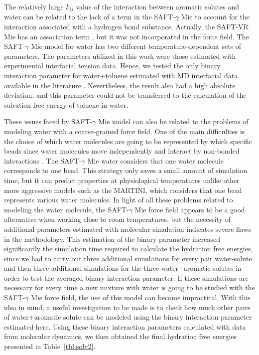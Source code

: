 \documentclass[final,12p,times,twocolumn]{elsarticle}
\begin{document}
	The relatively large $k_{ij}$ value of the interaction between aromatic solutes and water can be related to the lack of a term in the SAFT-$\gamma$ Mie to account for the interaction associated with a hydrogen bond substance. Actually, the SAFT-VR Mie has an association term \cite{lafitte2013}, but it was not incorporated in the force field. The SAFT-$\gamma$ Mie model for water \cite{lobanova2016} has two different temperature-dependent sets of parameters. The parameters utilized in this work were those estimated with experimental interfacial tension data. Hence, we tested the only binary interaction parameter for water+toluene estimated with MD interfacial data available in the literature \cite{herdes2017}. Nevertheless, the result also had a high absolute deviation, and this parameter could not be transferred to the calculation of the solvation free energy of toluene in water. 
	
	These issues faced by SAFT-$\gamma$ Mie model can also be related to the problems of modeling water with a coarse-grained force field. One of the main difficulties is the choice of which water molecules are going to be represented by which specific beads since water molecules move independently and interact by non-bonded interactions \cite{hadley2010,hadley2012}. The  SAFT-$\gamma$ Mie water considers that one water molecule corresponds to one bead. This strategy only saves a small amount of simulation time, but it can predict properties at physiological temperatures unlike other more aggressive models such as the MARTINI, which considers that one bead represents various water molecules. In light of all these problems related to modeling the water molecule, the SAFT-$\gamma$ Mie force field appears to be a good alternative when working close to room temperatures, but the necessity of additional parameters estimated with molecular simulation indicates severe flaws in the methodology. This estimation of the binary parameter increased significantly the simulation time required to calculate the hydration free energies, since we had to carry out three additional simulations for every pair water-solute and then three additional simulations for the three water+aromatic solutes in order to test the averaged binary interaction parameter. If these simulations are necessary for every time a new mixture with water is going to be studied with the SAFT-$\gamma$ Mie force field, the use of this model can become impractical.  With this idea in mind, a useful investigation to be made is to check how much other pairs of water+aromatic solute can be modeled using the binary interaction parameter estimated here. Using these binary interaction parameters calculated with data from molecular dynamics, we then obtained the final hydration free energies presented in Table~\ref{tbl:solv2}. 
	
\end{document}
